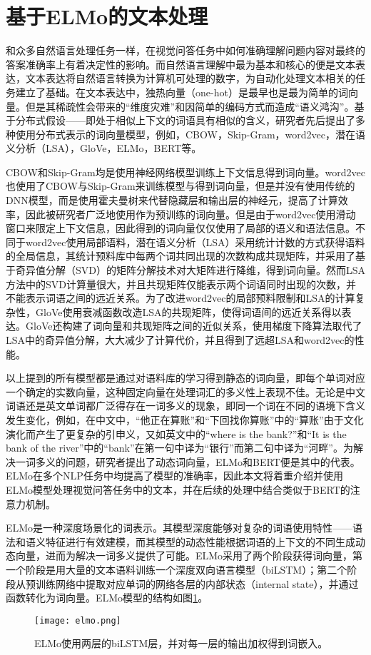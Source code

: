 \section{基于ELMo的文本处理}
和众多自然语言处理任务一样，在视觉问答任务中如何准确理解问题内容对最终的答案准确率上有着决定性的影响。而自然语言理解中最为基本和核心的便是文本表达，文本表达将自然语言转换为计算机可处理的数字，为自动化处理文本相关的任务建立了基础。在文本表达中，独热向量（one-hot）是最早也是最为简单的词向量。但是其稀疏性会带来的“维度灾难”和因简单的编码方式而造成“语义鸿沟”。基于分布式假设——即处于相似上下文的词语具有相似的含义，研究者先后提出了多种使用分布式表示的词向量模型，例如，CBOW，Skip-Gram，word2vec，潜在语义分析（LSA），GloVe，ELMo，BERT等。

CBOW和Skip-Gram均是使用神经网络模型训练上下文信息得到词向量。word2vec也使用了CBOW与Skip-Gram来训练模型与得到词向量，但是并没有使用传统的DNN模型，而是使用霍夫曼树来代替隐藏层和输出层的神经元，提高了计算效率，因此被研究者广泛地使用作为预训练的词向量。但是由于word2vec使用滑动窗口来限定上下文信息，因此得到的词向量仅仅使用了局部的语义和语法信息。不同于word2vec使用局部语料，潜在语义分析（LSA）采用统计计数的方式获得语料的全局信息，其统计预料库中每两个词共同出现的次数构成共现矩阵，并采用了基于奇异值分解（SVD）的矩阵分解技术对大矩阵进行降维，得到词向量。然而LSA方法中的SVD计算量很大，并且共现矩阵仅能表示两个词语同时出现的次数，并不能表示词语之间的远近关系。为了改进word2vec的局部预料限制和LSA的计算复杂性，GloVe使用衰减函数改造LSA的共现矩阵，使得词语间的远近关系得以表达。GloVe还构建了词向量和共现矩阵之间的近似关系，使用梯度下降算法取代了LSA中的奇异值分解，大大减少了计算代价，并且得到了远超LSA和word2vec的性能。

以上提到的所有模型都是通过对语料库的学习得到静态的词向量，即每个单词对应一个确定的实数向量，这种固定向量在处理词汇的多义性上表现不佳。无论是中文词语还是英文单词都广泛得存在一词多义的现象，即同一个词在不同的语境下含义发生变化，例如，在中文中，“他正在算账”和“下回找你算账”中的“算账”由于文化演化而产生了更复杂的引申义，又如英文中的“where is the bank?”和“It is the bank of the river”中的“bank”在第一句中译为“银行”而第二句中译为“河畔”。为解决一词多义的问题，研究者提出了动态词向量，ELMo和BERT便是其中的代表。ELMo在多个NLP任务中均提高了模型的准确率，因此本文将着重介绍并使用ELMo模型处理视觉问答任务中的文本，并在后续的处理中结合类似于BERT的注意力机制。

ELMo是一种深度场景化的词表示。其模型深度能够对复杂的词语使用特性——语法和语义特征进行有效建模，而其模型的动态性能根据词语的上下文的不同生成动态向量，进而为解决一词多义提供了可能。ELMo采用了两个阶段获得词向量，第一个阶段是用大量的文本语料训练一个深度双向语言模型（biLSTM）；第二个阶段从预训练网络中提取对应单词的网络各层的内部状态（internal state），并通过函数转化为词向量。ELMo模型的结构如图\ref{elmo}。
\begin{figure}[H]
	\texttt{[image: elmo.png]}
	\caption{ELMo使用两层的biLSTM层，并对每一层的输出加权得到词嵌入。}
	\label{elmo}
\end{figure}

